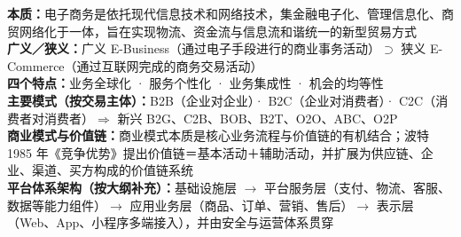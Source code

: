\documentclass[a4paper,11pt]{article}
\begin{document}

\begin{knowmap}
\textbf{本质：}电子商务是依托现代信息技术和网络技术，集金融电子化、管理信息化、商贸网络化于一体，旨在实现物流、资金流与信息流和谐统一的新型贸易方式\\[2pt]
\textbf{广义／狭义：}广义 E-Business（通过电子手段进行的商业事务活动）$\supset$ 狭义 E-Commerce（通过互联网完成的商务交易活动）\\[2pt]
\textbf{四个特点：}业务全球化 · 服务个性化 · 业务集成性 · 机会的均等性\\[2pt]
\textbf{主要模式（按交易主体）：}B2B（企业对企业）· B2C（企业对消费者）· C2C（消费者对消费者）$\Rightarrow$ 新兴 B2G、C2B、BOB、B2T、O2O、ABC、O2P\\[2pt]
\textbf{商业模式与价值链：}商业模式本质是核心业务流程与价值链的有机结合；波特 1985 年《竞争优势》提出价值链＝基本活动＋辅助活动，并扩展为供应链、企业、渠道、买方构成的价值链系统\\[2pt]
\textbf{平台体系架构（按大纲补充）：}基础设施层 $\rightarrow$ 平台服务层（支付、物流、客服、数据等能力组件）$\rightarrow$ 应用业务层（商品、订单、营销、售后）$\rightarrow$ 表示层（Web、App、小程序多端接入），并由安全与运营体系贯穿
\end{knowmap}
\end{document}
